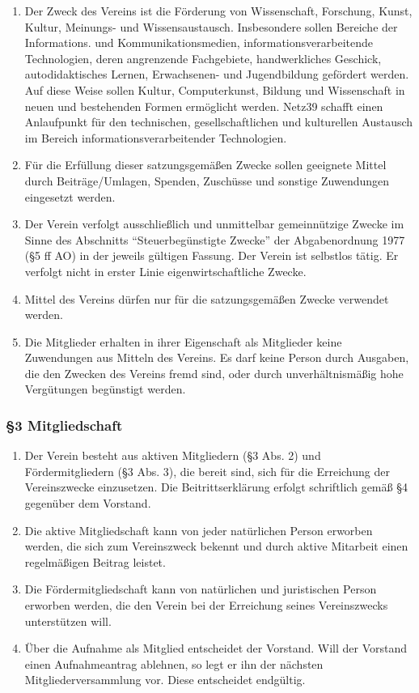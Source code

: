 \documentclass[german]{article}
\begin{document}
\begin{enumerate}
\def\labelenumi{\arabic{enumi}.}
\item
  Der Zweck des Vereins ist die Förderung von Wissenschaft, Forschung,
  Kunst, Kultur, Meinungs- und Wissensaustausch. Insbesondere sollen
  Bereiche der Informations. und Kommunikationsmedien,
  informationsverarbeitende Technologien, deren angrenzende Fachgebiete,
  handwerkliches Geschick, autodidaktisches Lernen, Erwachsenen- und
  Jugendbildung gefördert werden. Auf diese Weise sollen Kultur,
  Computerkunst, Bildung und Wissenschaft in neuen und bestehenden
  Formen ermöglicht werden. Netz39 schafft einen Anlaufpunkt für den
  technischen, gesellschaftlichen und kulturellen Austausch im Bereich
  informationsverarbeitender Technologien.
\item
  Für die Erfüllung dieser satzungsgemäßen Zwecke sollen geeignete
  Mittel durch Beiträge/Umlagen, Spenden, Zuschüsse und sonstige
  Zuwendungen eingesetzt werden.
\item
  Der Verein verfolgt ausschließlich und unmittelbar gemeinnützige
  Zwecke im Sinne des Abschnitts ``Steuerbegünstigte Zwecke'' der
  Abgabenordnung 1977 (§5 ff AO) in der jeweils gültigen Fassung. Der
  Verein ist selbstlos tätig. Er verfolgt nicht in erster Linie
  eigenwirtschaftliche Zwecke.
\item
  Mittel des Vereins dürfen nur für die satzungsgemäßen Zwecke verwendet
  werden.
\item
  Die Mitglieder erhalten in ihrer Eigenschaft als Mitglieder keine
  Zuwendungen aus Mitteln des Vereins. Es darf keine Person durch
  Ausgaben, die den Zwecken des Vereins fremd sind, oder durch
  unverhältnismäßig hohe Vergütungen begünstigt werden.
\end{enumerate}

\subsubsection*{§3 Mitgliedschaft}\label{mitgliedschaft}

\begin{enumerate}
\def\labelenumi{\arabic{enumi}.}
\item
  Der Verein besteht aus aktiven Mitgliedern (§3 Abs. 2) und
  Fördermitgliedern (§3 Abs. 3), die bereit sind, sich für die
  Erreichung der Vereinszwecke einzusetzen. Die Beitrittserklärung
  erfolgt schriftlich gemäß §4 gegenüber dem Vorstand.
\item
  Die aktive Mitgliedschaft kann von jeder natürlichen Person erworben
  werden, die sich zum Vereinszweck bekennt und durch aktive Mitarbeit
  einen regelmäßigen Beitrag leistet.
\item
  Die Fördermitgliedschaft kann von natürlichen und juristischen Person
  erworben werden, die den Verein bei der Erreichung seines
  Vereinszwecks unterstützen will.
\item
  Über die Aufnahme als Mitglied entscheidet der Vorstand. Will der
  Vorstand einen Aufnahmeantrag ablehnen, so legt er ihn der nächsten
  Mitgliederversammlung vor. Diese entscheidet endgültig.
\end{enumerate}
\end{document}

